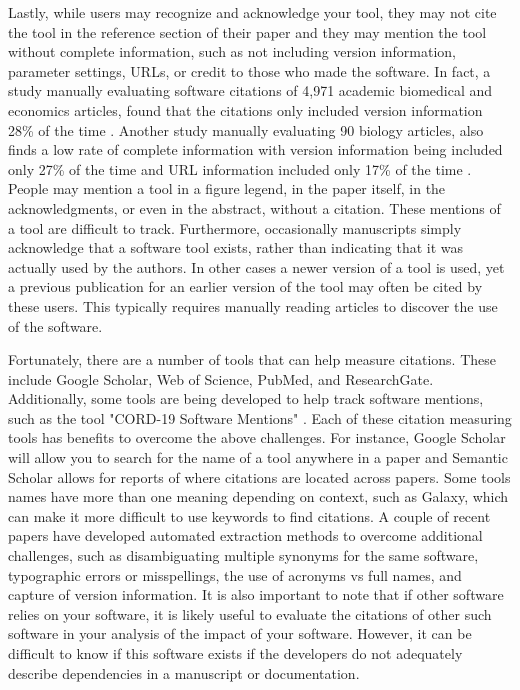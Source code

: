 \documentclass{article}
\begin{document}
Lastly, while users may recognize and acknowledge your tool, they may not cite the tool in the reference section of their paper and they may mention the tool without complete information, such as not including version information, parameter settings, URLs, or credit to those who made the software. In fact, a study manually evaluating software citations of 4,971 academic biomedical and economics articles, found that the citations only included version information  28\% of the time \cite{howison_software_2016}.  Another study manually evaluating 90 biology articles, also finds a low rate of complete information with version information being included only 27\% of the time and URL information included only 17\% of the time \cite{du_softcite_2021}. People may mention a tool in a figure legend, in the paper itself, in the acknowledgments, or even in the abstract, without a citation. These mentions of a tool are difficult to track. Furthermore, occasionally manuscripts simply acknowledge that a software tool exists, rather than indicating that it was actually used by the authors. In other cases a newer version of a tool is used, yet a previous publication for an earlier version of the tool may often be cited by these users. This typically requires manually reading articles to discover the use of the software. 

Fortunately, there are a number of tools that can help measure citations. These include Google Scholar, Web of Science, PubMed, and ResearchGate. Additionally, some tools are being developed to help track software mentions, such as the tool "CORD-19 Software Mentions" \cite{wade_cord-19_2021}. Each of these citation measuring tools has benefits to overcome the above challenges. For instance, Google Scholar will allow you to search for the name of a tool anywhere in a paper and Semantic Scholar allows for reports of where citations are located across papers. Some tools names have more than one meaning depending on context, such as Galaxy, which can make it more difficult to use keywords to find citations. A couple of recent papers \cite{istrate_large_2022, schindler_role_2022} have developed automated extraction methods to overcome additional challenges, such as disambiguating multiple synonyms for the same software, typographic errors or misspellings, the use of acronyms vs full names, and capture of version information. It is also important to note that if other software relies on your software, it is likely useful to evaluate the citations of other such software in your analysis of the impact of your software. However, it can be difficult to know if this software exists if the developers do not adequately describe dependencies in a manuscript or documentation.
\end{document}
